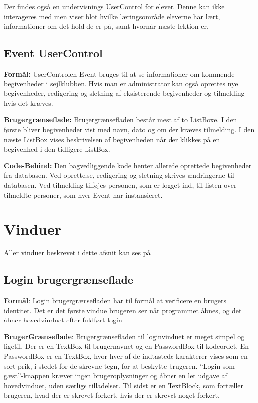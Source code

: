 Der findes også en undervisnings UserControl for elever. 
Denne kan ikke interageres med men viser blot hvilke læringsområde eleverne har lært, informationer om det hold de er på, samt hvornår næste lektion er.

\subsection{Event UserControl}
\textbf{Formål:}
UserControlen Event bruges til at se informationer om kommende begivenheder i sejlklubben. 
Hvis man er administrator kan også oprettes nye begivenheder, redigering og sletning af eksisterende begivenheder og tilmelding hvis det kræves.

\textbf{Brugergrænseflade:}
Brugergrænsefladen består mest af to ListBoxe.
I den første bliver begivenheder vist med navn, dato og om der kræves tilmelding.
I den næste ListBox vises beskrivelsen af begivenheden når der klikkes på en begivenhed i den tidligere ListBox. 

\textbf{Code-Behind:}
Den bagvedliggende kode henter allerede oprettede begivenheder fra databasen. 
Ved oprettelse, redigering og sletning skrives ændringerne til databasen. 
Ved tilmelding tilføjes personen, som er logget ind, til listen over tilmeldte personer, som hver Event har instansieret. 

\section{Vinduer}
Aller vinduer beskrevet i dette afsnit kan ses på 

\subsection{Login brugergrænseflade}
 
\textbf{Formål}:
Login brugergrænsefladen har til formål at verificere en brugers identitet. 
Det er det første vindue brugeren ser når programmet åbnes, og det åbner hovedvinduet efter fuldført login.
 
\textbf{BrugerGrænseflade}: 
Brugergrænsefladen til loginvinduet er meget simpel og ligetil. 
Der er en TextBox til brugernavnet og en PasswordBox til kodeordet.
En PasswordBox er en TextBox, hvor hver af de indtastede karakterer vises som en sort prik, i stedet for de skrevne tegn, for at beskytte brugeren.
``Login som gæst''-knappen kræver ingen brugeroplysninger og åbner en let udgave af hovedvinduet, uden særlige tilladelser.
Til sidst er en TextBlock, som fortæller brugeren, hvad der er skrevet forkert, hvis der er skrevet noget forkert.

